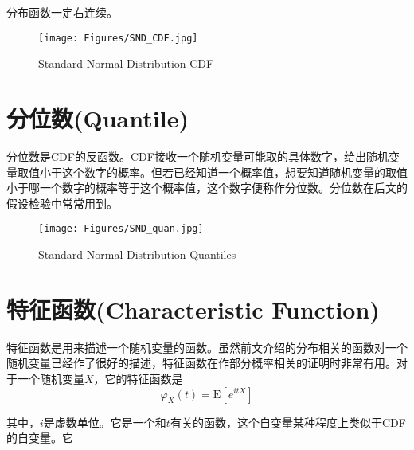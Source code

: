 \documentclass[UTF8]{ctexbook}
\begin{document}
分布函数一定右连续。

\newpage %
\begin{figure}[ht]
	\centering
	\texttt{[image: Figures/SND\_CDF.jpg]}
	\caption{Standard Normal Distribution CDF}
	\label{fig:StNor_CDF}
\end{figure}

\section{分位数(Quantile)}
分位数是CDF的反函数。CDF接收一个随机变量可能取的具体数字，给出随机变量取值小于这个数字的概率。但若已经知道一个概率值，想要知道随机变量的取值小于哪一个数字的概率等于这个概率值，这个数字便称作分位数。分位数在后文的假设检验中常常用到。

\begin{figure}[ht]
	\centering
	\texttt{[image: Figures/SND\_quan.jpg]}
	\caption{Standard Normal Distribution Quantiles}
	\label{fig:StNor_quan}
\end{figure}

\section{特征函数(Characteristic Function)}
\label{characteristic-function}
特征函数是用来描述一个随机变量的函数。虽然前文介绍的分布相关的函数对一个随机变量已经作了很好的描述，特征函数在作部分概率相关的证明时非常有用。对于一个随机变量$X$，它的特征函数是
\[
	\varphi_X(t)=\mathrm E[e^{itX}]
\]

其中，$i$是虚数单位。它是一个和$t$有关的函数，这个自变量某种程度上类似于CDF的自变量。它
\end{document}
